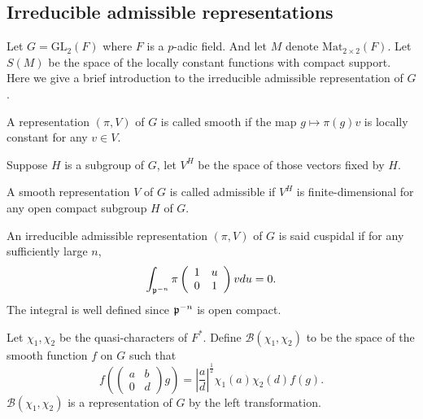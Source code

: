 \subsection{Irreducible admissible representations}
Let $G=\mathrm {GL}_2(F)$ where $F$ is a $p$-adic field. And let $M$ denote $\mathrm {Mat } _{2\times 2} (F)$. Let $S(M)$ be the space of the locally constant functions with compact support. 
Here we give a brief introduction to the irreducible admissible representation of $G$.

\begin{definition}
A representation $(\pi,V)$ of $G$ is called smooth if the map $g\mapsto \pi(g)v$ is locally constant for any $v\in V$.
\end{definition}


Suppose $H$ is a subgroup of $G$, let $V^H$ be the space of those vectors fixed by $H$.

\begin{definition}
A smooth representation $V$ of $G$ is called admissible if $V^H$ is finite-dimensional for any open compact subgroup $H$ of $G$.
\end{definition}

\begin{definition}
An irreducible admissible representation $(\pi,V)$ of $G$ is said cuspidal if for any sufficiently large $n$,
\[
\int_{\mathfrak p^{-n}} \pi\left (
\begin{array}{cc}
	1 & u \\
	0 & 1
\end{array} \right ) vdu=0.
\]
The integral is well defined since $\mathfrak p^{-n}$ is open compact.
\end{definition}

\begin{definition}
Let $\chi_1,\chi_2$ be the quasi-characters of $F^*$. Define $\mathcal B(\chi_1,\chi_2)$ to be the space of the smooth function $f$ on $G$ such that 
\begin{equation}\label{eq1.1.1}
f\left ( \left ( \begin{array} {cc}
a & b\\
0 & d
\end{array} \right ) g\right )
= \left | \frac a d \right | ^{\frac 1 2} \chi_1(a) \chi_2(d) f(g).
\end{equation}
$\mathcal B(\chi_1,\chi_2)$ is a representation of $G$ by the left transformation.
\end{definition} 

